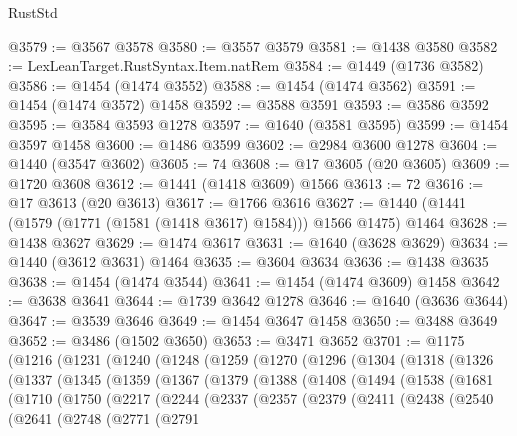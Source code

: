 \begin{lexlean}{RustStd}
\begin{coremodule}
{\begin{coremodule}
{{{{{{{{{{{{{{{{{{{{{{{{{{{{{{{@3579 := @3567 @3578
@3580 := @3557 @3579
@3581 := @1438 @3580
@3582 := LexLeanTarget.RustSyntax.Item.natRem
@3584 := @1449 (@1736 @3582)
@3586 := @1454 (@1474 @3552)
@3588 := @1454 (@1474 @3562)
@3591 := @1454 (@1474 @3572) @1458
@3592 := @3588 @3591
@3593 := @3586 @3592
@3595 := @3584 @3593 @1278
@3597 := @1640 (@3581 @3595)
@3599 := @1454 @3597 @1458
@3600 := @1486 @3599
@3602 := @2984 @3600 @1278
@3604 := @1440 (@3547 @3602)
@3605 := 74
@3608 := @17 @3605 (@20 @3605)
@3609 := @1720 @3608
@3612 := @1441 (@1418 @3609) @1566
@3613 := 72
@3616 := @17 @3613 (@20 @3613)
@3617 := @1766 @3616
@3627 := @1440 (@1441 (@1579 (@1771 (@1581 (@1418 @3617) @1584))) @1566 @1475) @1464
@3628 := @1438 @3627
@3629 := @1474 @3617
@3631 := @1640 (@3628 @3629)
@3634 := @1440 (@3612 @3631) @1464
@3635 := @3604 @3634
@3636 := @1438 @3635
@3638 := @1454 (@1474 @3544)
@3641 := @1454 (@1474 @3609) @1458
@3642 := @3638 @3641
@3644 := @1739 @3642 @1278
@3646 := @1640 (@3636 @3644)
@3647 := @3539 @3646
@3649 := @1454 @3647 @1458
@3650 := @3488 @3649
@3652 := @3486 (@1502 @3650)
@3653 := @3471 @3652
@3701 := @1175
    (@1216
      (@1231
        (@1240
          (@1248
            (@1259
              (@1270
                (@1296
                  (@1304
                    (@1318
                      (@1326
                        (@1337
                          (@1345
                            (@1359
                              (@1367
                                (@1379
                                  (@1388
                                    (@1408
                                      (@1494
                                        (@1538
                                          (@1681
                                            (@1710
                                              (@1750
                                                (@2217
                                                  (@2244
                                                    (@2337
                                                      (@2357
                                                        (@2379
                                                          (@2411
                                                            (@2438
                                                              (@2540
                                                                (@2641
                                                                  (@2748
                                                                    (@2771
                                                                      (@2791
}}}}}}}}}}}}}}}}}}}}}}}}}}}}}}}
\end{coremodule}}
\end{coremodule}
\end{lexlean}
